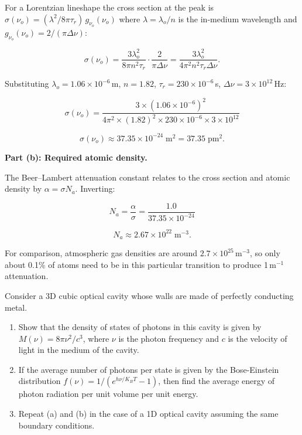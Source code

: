 For a Lorentzian lineshape the cross section at the peak is $\sigma(\nu_o) = (\lambda^2/8\pi\tau_r)\,g_{\nu_o}(\nu_o)$ where $\lambda = \lambda_o/n$ is the in-medium wavelength and $g_{\nu_o}(\nu_o) = 2/(\pi\Delta\nu)$:

\begin{equation*}
  \sigma(\nu_o) = \frac{3\lambda_o^{2}}{8\pi n^{2}\tau_r}\cdot\frac{2}{\pi\Delta\nu}
  = \frac{3\lambda_o^{2}}{4\pi^{2}n^{2}\tau_r\Delta\nu}.
\end{equation*}

Substituting $\lambda_o = 1.06\times10^{-6}$\,m, $n = 1.82$, $\tau_r = 230\times10^{-6}$\,s, $\Delta\nu = 3\times10^{12}$\,Hz:

\begin{equation*}
  \sigma(\nu_o) = \frac{3\times(1.06\times10^{-6})^{2}}{4\pi^{2}\times(1.82)^{2}\times230\times10^{-6}\times3\times10^{12}}
\end{equation*}

\begin{equation*}
  \boxed{\sigma(\nu_o) \approx 37.35\times10^{-24}\;\text{m}^{2} = 37.35\;\text{pm}^{2}.}
\end{equation*}

\textbf{Part (b): Required atomic density.}

The Beer--Lambert attenuation constant relates to the cross section and atomic density by $\alpha = \sigma N_a$. Inverting:

\begin{equation*}
  N_a = \frac{\alpha}{\sigma} = \frac{1.0}{37.35\times10^{-24}}
\end{equation*}

\begin{equation*}
  \boxed{N_a \approx 2.67\times10^{22}\;\text{m}^{-3}.}
\end{equation*}

For comparison, atmospheric gas densities are around $2.7\times10^{25}$\,m$^{-3}$, so only about 0.1\% of atoms need to be in this particular transition to produce 1\,m$^{-1}$ attenuation.


\begin{question}Consider a 3D cubic optical cavity whose walls are made
of perfectly conducting metal.
\begin{enumerate}[label=(\alph*)]
  \item Show that the density of states of photons in this cavity is given by
        $M(\nu)=8\pi\nu^{2}/c^{3}$, where $\nu$ is the photon frequency and $c$ is the velocity
        of light in the medium of the cavity.
  \item If the average number of photons per state is given by the Bose-Einstein distribution
        $f(\nu)=1/(e^{h\nu/K_{B}T}-1)$, then find the average energy of photon radiation per
        unit volume per unit energy.
  \item Repeat (a) and (b) in the case of a 1D optical cavity assuming the same boundary
        conditions.
\end{enumerate}
\end{question}

